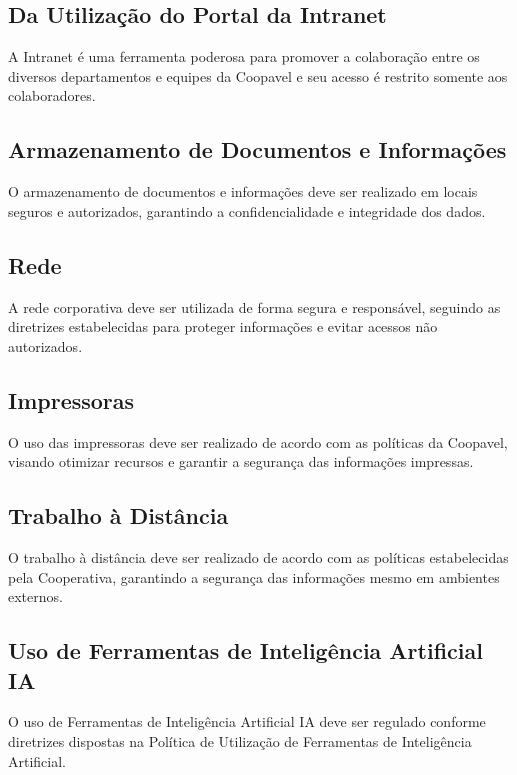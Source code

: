 \documentclass[letterpaper,10pt,brazil]{sphinxmanual}
\begin{document}
\subsection{Da Utilização do Portal da Intranet}
\label{\detokenize{regras:da-utilizacao-do-portal-da-intranet}}
\sphinxAtStartPar
A Intranet é uma ferramenta poderosa para promover a colaboração entre os diversos
departamentos e equipes da Coopavel e seu acesso é restrito somente aos colaboradores.


\subsection{Armazenamento de Documentos e Informações}
\label{\detokenize{regras:armazenamento-de-documentos-e-informacoes}}
\sphinxAtStartPar
O armazenamento de documentos e informações deve ser realizado em locais seguros e
autorizados, garantindo a confidencialidade e integridade dos dados.


\subsection{Rede}
\label{\detokenize{regras:rede}}
\sphinxAtStartPar
A rede corporativa deve ser utilizada de forma segura e responsável, seguindo as
diretrizes estabelecidas para proteger informações e evitar acessos não autorizados.


\subsection{Impressoras}
\label{\detokenize{regras:impressoras}}
\sphinxAtStartPar
O uso das impressoras deve ser realizado de acordo com as políticas da Coopavel,
visando otimizar recursos e garantir a segurança das informações impressas.


\subsection{Trabalho à Distância}
\label{\detokenize{regras:trabalho-a-distancia}}
\sphinxAtStartPar
O trabalho à distância deve ser realizado de acordo com as políticas estabelecidas pela
Cooperativa, garantindo a segurança das informações mesmo em ambientes externos.


\subsection{Uso de Ferramentas de Inteligência Artificial \sphinxhyphen{} IA}
\label{\detokenize{regras:uso-de-ferramentas-de-inteligencia-artificial-ia}}
\sphinxAtStartPar
O uso de Ferramentas de Inteligência Artificial \sphinxhyphen{} IA deve ser regulado conforme diretrizes
dispostas na Política de Utilização de Ferramentas de Inteligência Artificial.
\end{document}
